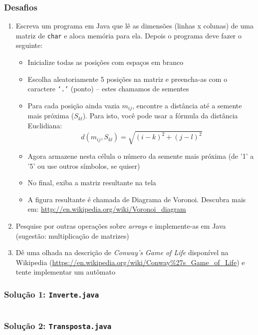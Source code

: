 \documentclass[xcolor={dvipsnames,table},aspectratio=169]{beamer}
\begin{document}
\begin{frame}[fragile]\frametitle{Desafios}
\begin{enumerate}
	\scriptsize
	\item Escreva um programa em Java que lê as dimensões (linhas x colunas) de uma matriz de \texttt{char} e aloca memória para ela. Depois o programa deve fazer o seguinte:
	\begin{itemize}
		\scriptsize
		\item Inicialize todas as posições com espaços em branco
		\item Escolha aleatoriamente 5 posições na matriz e preencha-as com o caractere \texttt{'.'} (ponto) -- estes chamamos de sementes
		\item Para cada posição ainda vazia $m_{ij}$, encontre a distância até a semente mais próxima ($S_{kl}$). Para isto, você pode usar a fórmula da distância Euclidiana:
\[ d(m_{ij},S_{kl}) = \sqrt{(i-k)^2 + (j-l)^2} \]
		\item Agora armazene nesta célula o número da semente mais próxima (de '1' a '5' ou use outros símbolos, se quiser)
		\item No final, exiba a matriz resultante na tela
		\item A figura resultante é chamada de Diagrama de Voronoi. Descubra mais em: \url{http://en.wikipedia.org/wiki/Voronoi_diagram}
	\end{itemize}
	\item Pesquise por outras operações sobre \emph{arrays} e implemente-as em Java (sugestão: multiplicação de matrizes)
	\item Dê uma olhada na descrição de \emph{Conway's Game of Life} disponível na Wikipedia (\url{https://en.wikipedia.org/wiki/Conway%27s_Game_of_Life}) e tente implementar um autômato
\end{enumerate}
\end{frame}

\begin{frame}[fragile]\frametitle{Solução 1: \texttt{Inverte.java}}
\tiny{\inputminted[bgcolor=cyan!10]{java}{src/Inverte.java}}
\end{frame}

\begin{frame}[fragile]\frametitle{Solução 2: \texttt{Transposta.java}}
\tiny{\inputminted[bgcolor=cyan!10]{java}{src/Transposta.java}}
\end{frame}
\end{document}
